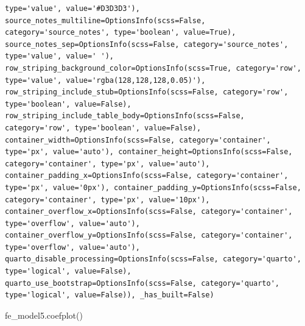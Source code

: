 \documentclass[
  letterpaper,
  DIV=11,
  numbers=noendperiod]{scrreprt}
\newenvironment{Shaded}{\begin{snugshade}}{\end{snugshade}}
\newcommand{\NormalTok}[1]{\textcolor[rgb]{0.00,0.23,0.31}{#1}}
\begin{document}
\begin{verbatim}
type='value', value='#D3D3D3'), source_notes_multiline=OptionsInfo(scss=False, category='source_notes', type='boolean', value=True), source_notes_sep=OptionsInfo(scss=False, category='source_notes', type='value', value=' '), row_striping_background_color=OptionsInfo(scss=True, category='row', type='value', value='rgba(128,128,128,0.05)'), row_striping_include_stub=OptionsInfo(scss=False, category='row', type='boolean', value=False), row_striping_include_table_body=OptionsInfo(scss=False, category='row', type='boolean', value=False), container_width=OptionsInfo(scss=False, category='container', type='px', value='auto'), container_height=OptionsInfo(scss=False, category='container', type='px', value='auto'), container_padding_x=OptionsInfo(scss=False, category='container', type='px', value='0px'), container_padding_y=OptionsInfo(scss=False, category='container', type='px', value='10px'), container_overflow_x=OptionsInfo(scss=False, category='container', type='overflow', value='auto'), container_overflow_y=OptionsInfo(scss=False, category='container', type='overflow', value='auto'), quarto_disable_processing=OptionsInfo(scss=False, category='quarto', type='logical', value=False), quarto_use_bootstrap=OptionsInfo(scss=False, category='quarto', type='logical', value=False)), _has_built=False)
\end{verbatim}

\begin{Shaded}
\begin{Highlighting}[]
\NormalTok{fe\_model5.coefplot()}
\end{Highlighting}
\end{Shaded}
\end{document}
